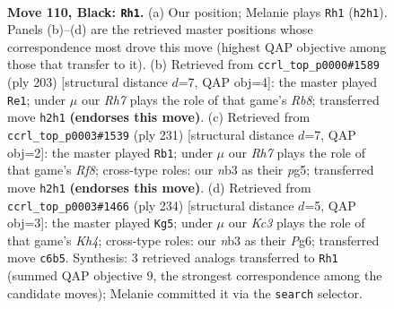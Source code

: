 \documentclass[11pt]{article}
\begin{document}
\clearpage

\begin{figure}[p]\centering
\begin{subfigure}{0.46\textwidth}\centering
\resizebox{\linewidth}{!}{%
\newchessgame
\chessboard[
  setfen={8/4R3/2k5/6K1/6P1/1N6/7r/8 b - - 4 110},
  showmover=false,
  pgfstyle=straightmove, color=movearrow, markmove={h2-h1}
]}
\caption{}
\end{subfigure}\hfill
\begin{subfigure}{0.46\textwidth}\centering
\resizebox{\linewidth}{!}{%
\newchessgame
\chessboard[
  setfen={3k4/8/8/K7/P1R5/8/8/1r6 b - - 4 102},
  showmover=false,
  pgfstyle=straightmove, color=movearrow, markmove={b1-e1}
]}
\caption{}
\end{subfigure}
\\[4pt]
\begin{subfigure}{0.46\textwidth}\centering
\resizebox{\linewidth}{!}{%
\newchessgame
\chessboard[
  setfen={8/6k1/3R4/6P1/6P1/6K1/8/5r2 b - - 6 116},
  showmover=false,
  pgfstyle=straightmove, color=movearrow, markmove={f1-b1}
]}
\caption{}
\end{subfigure}\hfill
\begin{subfigure}{0.46\textwidth}\centering
\resizebox{\linewidth}{!}{%
\newchessgame
\chessboard[
  setfen={8/5R2/4p1P1/4k3/7K/8/8/2r5 w - - 0 118},
  showmover=false,
  pgfstyle=straightmove, color=movearrow, markmove={h4-g5}
]}
\caption{}
\end{subfigure}
\caption{\textbf{Move 110, Black: \texttt{Rh1}.} (a) Our position; Melanie plays \texttt{Rh1} (\texttt{h2h1}). Panels (b)--(d) are the retrieved master positions whose correspondence most drove this move (highest QAP objective among those that transfer to it). (b) Retrieved from \texttt{ccrl\_top\_p0000\#1589} (ply 203) [structural distance $d$=7, QAP obj=4]: the master played \texttt{Re1}; under $\mu$ our \emph{Rh7} plays the role of that game's \emph{Rb8}; transferred move \texttt{h2h1} \textbf{(endorses this move)}. (c) Retrieved from \texttt{ccrl\_top\_p0003\#1539} (ply 231) [structural distance $d$=7, QAP obj=2]: the master played \texttt{Rb1}; under $\mu$ our \emph{Rh7} plays the role of that game's \emph{Rf8}; cross-type roles: our \emph{n}b3 as their \emph{p}g5; transferred move \texttt{h2h1} \textbf{(endorses this move)}. (d) Retrieved from \texttt{ccrl\_top\_p0003\#1466} (ply 234) [structural distance $d$=5, QAP obj=3]: the master played \texttt{Kg5}; under $\mu$ our \emph{Kc3} plays the role of that game's \emph{Kh4}; cross-type roles: our \emph{n}b3 as their \emph{P}g6; transferred move \texttt{c6b5}. Synthesis: 3 retrieved analogs transferred to \texttt{Rh1} (summed QAP objective 9, the strongest correspondence among the candidate moves); Melanie committed it via the \texttt{search} selector.}
\label{fig:thought-m219}
\end{figure}
\end{document}
